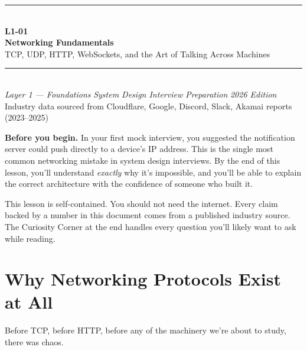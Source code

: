 \documentclass[11pt,a4paper]{article}
\begin{document}
\begin{titlepage}
\vspace*{2cm}
\begin{center}
  {\color{primary}\rule{\linewidth}{3pt}}\\[12pt]
  {\huge\bfseries\color{highlight} L1-01}\\[6pt]
  {\Huge\bfseries\color{primary} Networking Fundamentals}\\[10pt]
  {\large\color{primary!70} TCP, UDP, HTTP, WebSockets, and the Art of Talking Across Machines}\\[20pt]
  {\color{primary}\rule{\linewidth}{1pt}}\\[16pt]
  {\normalsize\color{primary!70}
    \textit{Layer 1 --- Foundations} \quad\textbullet\quad
    \textit{System Design Interview Preparation} \quad\textbullet\quad
    \textit{2026 Edition}
  }\\[8pt]
  {\small\color{primary!60} Industry data sourced from Cloudflare, Google, Discord, Slack, Akamai reports (2023--2025)}
\end{center}
\vfill
\begin{insightbox}
\textbf{Before you begin.} In your first mock interview, you suggested the notification server could push directly to a device's IP address. This is the single most common networking mistake in system design interviews. By the end of this lesson, you'll understand \emph{exactly} why it's impossible, and you'll be able to explain the correct architecture with the confidence of someone who built it.

This lesson is self-contained. You should not need the internet. Every claim backed by a number in this document comes from a published industry source. The Curiosity Corner at the end handles every question you'll likely want to ask while reading.
\end{insightbox}
\vspace{1cm}
\tableofcontents
\end{titlepage}

\newpage

\section{Why Networking Protocols Exist at All}

Before TCP, before HTTP, before any of the machinery we're about to study, there was chaos.
\end{document}
